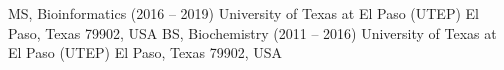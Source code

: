 %
%
%



\begin{referees}
		{MS, Bioinformatics (2016 -- 2019)}
		{University of Texas at El Paso (UTEP)}
		{}
		{El Paso, Texas 79902, USA}
		{}
		{BS, Biochemistry (2011 --  2016)}
		{University of Texas at El Paso (UTEP)}
		{}
		{El Paso, Texas 79902, USA}
		{}
\end{referees}